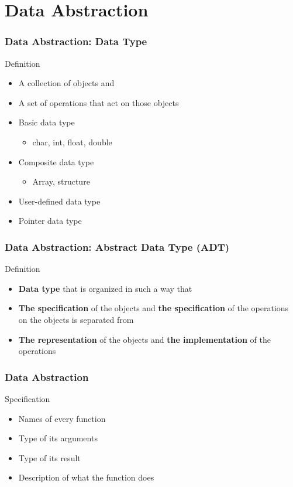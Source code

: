 \documentclass[newPxFont,sthlmFooter,nooffset]{beamer}
\begin{document}
\section{Data Abstraction}
\begin{frame}[t]
  \frametitle{Data Abstraction: Data Type}
Definition
\begin{itemize}
\item A collection of objects and
\item A set of operations that act on those objects
\end{itemize}

\begin{itemize}
\item Basic data type
  \begin{itemize}
  \item char, int, float, double
  \end{itemize}

\item Composite data type
  \begin{itemize}
  \item Array, structure
  \end{itemize}
\item User-defined data type
\item Pointer data type
\end{itemize}

\end{frame}

\begin{frame}[t]
  \frametitle{Data Abstraction: Abstract Data Type (ADT)}
Definition
\begin{itemize}
\item \textbf{Data type} that is organized in such a way that
\item \textbf{The specification} of the objects and \textbf{the specification} of the operations on the objects is separated from
\item \textbf{The representation} of the objects and \textbf{the implementation} of the operations
\end{itemize}


\end{frame}
\begin{frame}[t]
  \frametitle{Data Abstraction}
Specification
\begin{itemize}
\item Names of every function
\item Type of its arguments
\item Type of its result
\item Description of what the function does
\end{itemize}

\end{frame}
\end{document}
